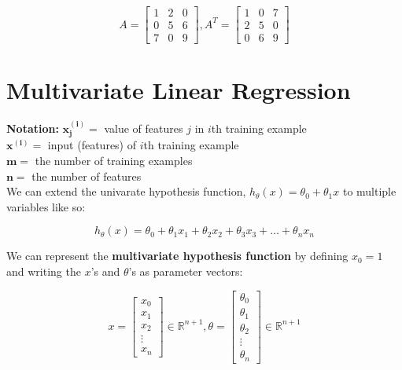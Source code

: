\begin{equation*}
    A =
    \begin{bmatrix}
        1 & 2 & 0 \\
        0 & 5 & 6 \\
        7 & 0 & 9
    \end{bmatrix}
    , A^T =
    \begin{bmatrix}
        1 & 0 & 7 \\
        2 & 5 & 0 \\
        0 & 6 & 9
    \end{bmatrix}
\end{equation*}



\pagebreak
\section{Multivariate Linear Regression}
\textbf{Notation:}
$\bm{x_j^{(i)}}=$ value of features $j$ in $i$th training example \\
$\bm{x^{(i)}}=$ input (features) of $i$th training example \\
$\bm{m}=$ the number of training examples \\
$\bm{n}=$ the number of features \\

\noindent We can extend the univarate hypothesis function, $h_\theta(x)=\theta_0+\theta_1 x $ to
multiple variables like so:

\begin{equation*}
    h_{\theta}(x) = \theta_0 + \theta_1 x_1 + \theta_2 x_2 + \theta_3 x_3+\dots+\theta_n x_n
\end{equation*}

\noindent We can represent the \textbf{multivariate hypothesis function} by defining $x_0=1$ and
writing the $x$'s and $\theta$'s as parameter vectors:

\begin{equation*}
    x = \begin{bmatrix}
            x_0 \\
            x_1 \\
            x_2 \\
            \vdots \\
            x_n
    \end{bmatrix}
    \in\mathbb{R}^{n+1}
    ,\theta = \begin{bmatrix}
                  \theta_0 \\
                  \theta_1 \\
                  \theta_2 \\
                  \vdots \\
                  \theta_n
    \end{bmatrix}
    \in\mathbb{R}^{n+1}
\end{equation*}

